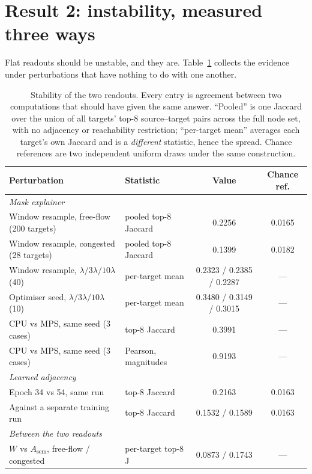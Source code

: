 \documentclass{article}
\begin{document}
\section{Result 2: instability, measured three ways}

Flat readouts should be unstable, and they are. Table~\ref{tab:stability} collects
the evidence under perturbations that have nothing to do with one another.

\begin{table}[h]
\centering
\caption{Stability of the two readouts. Every entry is agreement between two
computations that should have given the same answer. ``Pooled'' is one Jaccard over
the union of all targets' top-8 source--target pairs across the full node set, with
no adjacency or reachability restriction; ``per-target mean'' averages each target's
own Jaccard and is a \emph{different} statistic, hence the spread. Chance references
are two independent uniform draws under the same construction.}
\label{tab:stability}
\small
\setlength{\tabcolsep}{4pt}
\begin{tabular}{@{}llcc@{}}
\toprule
Perturbation & Statistic & Value & Chance ref. \\
\midrule
\multicolumn{4}{l}{\emph{Mask explainer}}\\
Window resample, free-flow (200 targets) & pooled top-8 Jaccard & 0.2256 & 0.0165 \\
Window resample, congested (28 targets)  & pooled top-8 Jaccard & 0.1399 & 0.0182 \\
Window resample, $\lambda/3\lambda/10\lambda$ (40) & per-target mean & 0.2323 / 0.2385 / 0.2287 & --- \\
Optimiser seed, $\lambda/3\lambda/10\lambda$ (10) & per-target mean & 0.3480 / 0.3149 / 0.3015 & --- \\
CPU vs MPS, same seed (3 cases) & top-8 Jaccard & 0.3991 & --- \\
CPU vs MPS, same seed (3 cases) & Pearson, magnitudes & 0.9193 & --- \\
\midrule
\multicolumn{4}{l}{\emph{Learned adjacency}}\\
Epoch 34 vs 54, same run & top-8 Jaccard & 0.2163 & 0.0163 \\
Against a separate training run & top-8 Jaccard & 0.1532 / 0.1589 & 0.0163 \\
\midrule
\multicolumn{4}{l}{\emph{Between the two readouts}}\\
$W$ vs $A_{\text{sem}}$, free-flow / congested & per-target top-8 J & 0.0873 / 0.1743 & --- \\
\bottomrule
\end{tabular}
\end{table}
\end{document}
